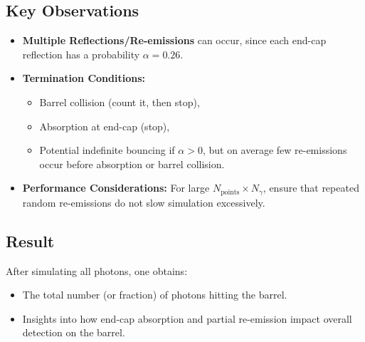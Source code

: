 \documentclass[11pt]{article}
\begin{document}
\subsection{Key Observations}
\begin{itemize}
  \item \textbf{Multiple Reflections/Re-emissions} can occur, since each end-cap reflection has a probability $\alpha = 0.26$.
  \item \textbf{Termination Conditions:}
    \begin{itemize}
      \item Barrel collision (count it, then stop),
      \item Absorption at end-cap (stop),
      \item Potential indefinite bouncing if $\alpha>0$, but on average few re-emissions occur before absorption or barrel collision.
    \end{itemize}
  \item \textbf{Performance Considerations:} For large $N_{\mathrm{points}} \times N_{\gamma}$, ensure that repeated random re-emissions do not slow simulation excessively.
\end{itemize}

\subsection{Result}
After simulating all photons, one obtains:
\begin{itemize}
  \item The total number (or fraction) of photons hitting the barrel.
  \item Insights into how end-cap absorption and partial re-emission impact overall detection on the barrel.
\end{itemize}
\end{document}
